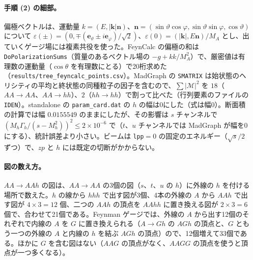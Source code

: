 \documentclass[a4paper,10pt]{ltjsarticle}
\begin{document}
\paragraph{手順 (2) の細部。}偏極ベクトルは、運動量 $k=(E,|\boldsymbol k|\boldsymbol n)$、$\boldsymbol n=(\sin\vartheta\cos\varphi,\sin\vartheta\sin\varphi,\cos\vartheta)$ について $\varepsilon(\pm)=(0,\mp(\boldsymbol e_\vartheta\pm i\boldsymbol e_\varphi)/\sqrt2)$、$\varepsilon(0)=(|\boldsymbol k|,E\boldsymbol n)/M_A$ とし、出ていくゲージ場には複素共役を使った。FeynCalc の偏極の和は \texttt{DoPolarizationSums}（質量のあるベクトル場の $-g+kk/M_A^2$）で、厳密値は有理数の運動量（$\cos\theta$ を有理数にとる）で20桁求めた（\texttt{results/tree\_feyncalc\_points.csv}）。MadGraph の \texttt{SMATRIX} は始状態のヘリシティの平均と終状態の同種粒子の因子を含むので、$\sum|\mathcal M|^2$ を $18$（$AA\to AA$、$AA\to hh$）、$2$（$hh\to hh$）で割って比べた（行列要素のファイルの \texttt{IDEN}）。standalone の \texttt{param\_card.dat} の $h$ の幅は0にした（式は幅0）。断面積の計算では幅 $0.0155549$ のままにしたが、その影響は $s$ チャンネルで $(M_h\Gamma_h/(s-M_h^2))^2\le2\times10^{-6}$ で（$t$、$u$ チャンネルでは MadGraph が幅を0にする）、統計誤差より小さい。ビームは \texttt{lpp}$=0$ の固定のエネルギー（$\sqrt s/2$ ずつ）で、$zp$ と $h$ には既定の切断がかからない。

\paragraph{図の数え方。}$AA\to AAh$ の図は、$AA\to AA$ の3個の図（$s$、$t$、$u$ の $h$）に外線の $h$ を付ける場所で数えた。$h$ の線から $hhh$ で出す図が3個、4本の外線の $A$ から $AAh$ で出す図が $4\times3=12$ 個、二つの $AAh$ の頂点を $AAhh$ に置き換える図が $2\times3=6$ 個で、合わせて21個である。Feynman ゲージでは、外線の $A$ から出す12個のそれぞれで内線の $A$ を $G$ に置き換えられる（$A\to Gh$ の $AGh$ の頂点と、$G$ ともう一つの外線の $A$ と内線の $h$ を結ぶ $AGh$ の頂点）ので、12個増えて33個である。ほかに $G$ を含む図はない（$AAG$ の頂点がなく、$AAGG$ の頂点を使うと頂点が一つ多くなる）。
\end{document}
